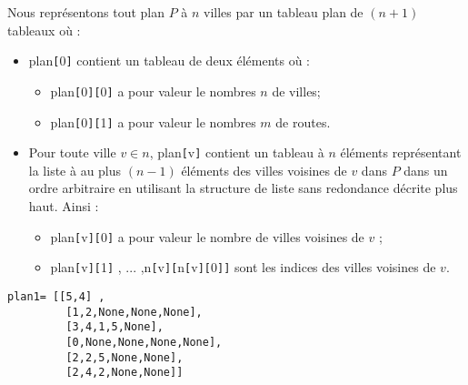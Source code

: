 Nous représentons tout plan $P$ à $n$ villes par un tableau plan de $(n+1)$ tableaux où :
\begin{itemize}
\item plan\verb![!0\verb!]! contient un tableau de deux éléments où :
\begin{itemize}
\item plan\verb![!0\verb!]!\verb![!0\verb!]! a pour valeur le nombres $n$ de villes;
\item plan\verb![!0\verb!]!\verb![!1\verb!]! a pour valeur le nombres $m$ de routes.
\end{itemize}
\end{itemize}


\begin{itemize}
\item Pour toute ville $v \in n$, plan\verb![!v\verb!]! contient un tableau à $n$ éléments représentant 
la liste à au plus $(n-1)$ éléments des villes voisines de $v$ dans $P$ dans un ordre arbitraire en utilisant
la structure de liste sans redondance décrite plus haut. Ainsi :
\begin{itemize}
\item plan\verb![!v\verb!]!\verb![!0\verb!]! a pour valeur le nombre de villes voisines de $v$ ;
\item plan\verb![!v\verb!]!\verb![!1\verb!]! , ... ,n\verb![!v\verb!]!\verb![!n\verb![!v\verb!]!\verb![!0\verb!]!\verb!]! sont les indices des villes voisines de $v$.
\end{itemize}
\end{itemize}

\begin{minipage}[c]{.45\linewidth}
\begin{center}
\end{center}
\end{minipage}
\hfill
\begin{minipage}[c]{.45\linewidth}
\begin{lstlisting}
plan1= [[5,4] ,
         [1,2,None,None,None],
         [3,4,1,5,None],
         [0,None,None,None,None],
         [2,2,5,None,None],
         [2,4,2,None,None]]
\end{lstlisting}
\end{minipage}
 
